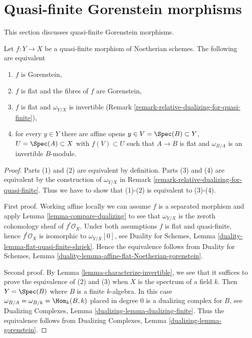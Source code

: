 \section{Quasi-finite Gorenstein morphisms}
\label{section-gorenstein-lci}

\noindent
This section discusses quasi-finite Gorenstein morphisms.

\begin{lemma}
\label{lemma-gorenstein-quasi-finite}
Let $f : Y \to X$ be a quasi-finite morphism of Noetherian schemes.
The following are equivalent
\begin{enumerate}
\item $f$ is Gorenstein,
\item $f$ is flat and the fibres of $f$ are Gorenstein,
\item $f$ is flat and $\omega_{Y/X}$ is invertible
(Remark \ref{remark-relative-dualizing-for-quasi-finite}),
\item for every $y \in Y$ there are affine opens
$y \in V = \Spec(B) \subset Y$, $U = \Spec(A) \subset X$
with $f(V) \subset U$ such that $A \to B$ is flat
and $\omega_{B/A}$ is an invertible $B$-module.
\end{enumerate}
\end{lemma}

\begin{proof}
Parts (1) and (2) are equivalent by definition. Parts (3) and (4)
are equivalent by the construction of $\omega_{Y/X}$ in
Remark \ref{remark-relative-dualizing-for-quasi-finite}.
Thus we have to show that (1)-(2) is equivalent to (3)-(4).

\medskip\noindent
First proof. Working affine locally we can assume $f$ is a separated
morphism and apply Lemma \ref{lemma-compare-dualizing} to see that
$\omega_{Y/X}$ is the zeroth cohomology sheaf of $f^!\mathcal{O}_X$.
Under both assumptions $f$ is flat and quasi-finite, hence
$f^!\mathcal{O}_X$ is isomorphic to $\omega_{Y/X}[0]$, see
Duality for Schemes, Lemma \ref{duality-lemma-flat-quasi-finite-shriek}. Hence
the equivalence follows from
Duality for Schemes, Lemma
\ref{duality-lemma-affine-flat-Noetherian-gorenstein}.

\medskip\noindent
Second proof. By Lemma \ref{lemma-characterize-invertible},
we see that it suffices to prove the equivalence of
(2) and (3) when $X$ is the spectrum of a field $k$.
Then $Y = \Spec(B)$ where $B$ is a finite $k$-algebra.
In this case $\omega_{B/A} = \omega_{B/k} = \Hom_k(B, k)$
placed in degree $0$ is a dualizing complex for $B$, see
Dualizing Complexes, Lemma \ref{dualizing-lemma-dualizing-finite}.
Thus the equivalence follows from
Dualizing Complexes, Lemma \ref{dualizing-lemma-gorenstein}.
\end{proof}

